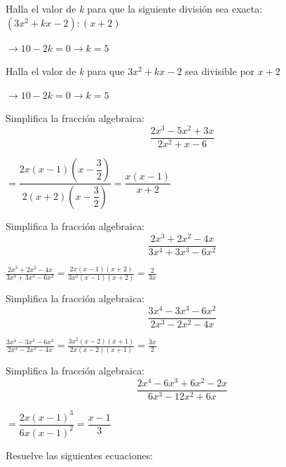 \documentclass[addpoints,spanish, 12pt,a4paper]{exam}
\begin{document}
\begin{questions}
\addpoints


\question[1] Halla el valor de \emph{k} para que la siguiente división sea exacta: $(3x^2+kx-2):(x+2)$
\begin{solution} $\to 10-2k=0 \to k=5 $ \end{solution}


\question[1] Halla el valor de \emph{k} para que $3x^2+kx-2$ sea divisible por $x+2$
\begin{solution} $\to 10-2k=0 \to k=5 $ \end{solution}

\addpoints

\question[1] Simplifica la fracción algebraica: $$\dfrac{2x^3-5x^2+3x}{2x^2+x-6} $$
\begin{solution}$=\dfrac{2x\left(x-1\right)\left(x-\dfrac{3}{2}\right)}{2\left(x+2\right)\left(x-\dfrac{3}{2}\right)}=\dfrac{x(x-1)}{x+2}$  \end{solution}

\question[1] Simplifica la fracción algebraica: $$\frac{2 x^{3} + 2 x^{2} - 4 x}{3 x^{4} + 3 x^{3} - 6 x^{2}}$$
\begin{solution} $\frac{2 x^{3} + 2 x^{2} - 4 x}{3 x^{4} + 3 x^{3} - 6 x^{2}}=\frac{2 x \left(x - 1\right) \left(x + 2\right)}{3 x^{2} \left(x - 1\right) \left(x + 2\right)}=\frac{2}{3 x}$  \end{solution}

\question[1] Simplifica la fracción algebraica: $$\frac{3 x^{4} - 3 x^{3} - 6 x^{2}}{2 x^{3} - 2 x^{2} - 4 x}$$
\begin{solution} $\frac{3 x^{4} - 3 x^{3} - 6 x^{2}}{2 x^{3} - 2 x^{2} - 4 x}=\frac{3 x^{2} \left(x - 2\right) \left(x + 1\right)}{2 x \left(x - 2\right) \left(x + 1\right)}=\frac{3 x}{2}$  \end{solution}

\addpoints

\question[1] Simplifica la fracción algebraica: $$\dfrac{2x^4-6x^3+6x^2-2x}{6x^3-12x^2+6x} $$
\begin{solution}$=\dfrac{2x\left(x-1\right)^3}{6x\left(x-1\right)^2}=\dfrac{x-1}{3}$ \end{solution}

\addpoints

\question Resuelve las siguientes ecuaciones: 
\end{questions}
\end{document}
